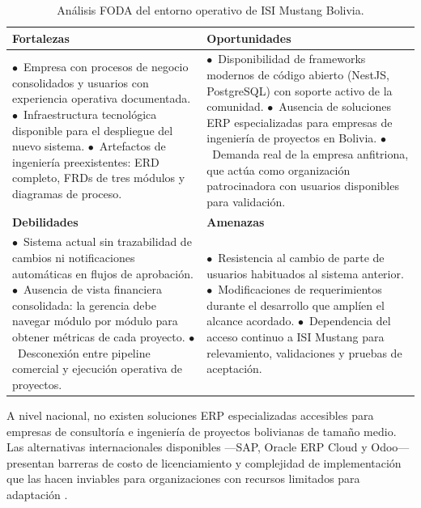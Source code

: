 \documentclass{univalle-perfil}
\begin{document}
\begin{table}[H]
\centering
\caption{Análisis FODA del entorno operativo de ISI Mustang Bolivia.}
{\renewcommand{\arraystretch}{1.5}
\begin{tabular}{|p{}|p{}|}
\hline
\textbf{Fortalezas} & \textbf{Oportunidades} \\
\hline
$\bullet$~Empresa con procesos de negocio consolidados y usuarios con experiencia operativa documentada.\newline
$\bullet$~Infraestructura tecnológica disponible para el despliegue del nuevo sistema.\newline
$\bullet$~Artefactos de ingeniería preexistentes: ERD completo, FRDs de tres módulos y diagramas de proceso.
&
$\bullet$~Disponibilidad de frameworks modernos de código abierto (NestJS, PostgreSQL) con soporte activo de la comunidad.\newline
$\bullet$~Ausencia de soluciones ERP especializadas para empresas de ingeniería de proyectos en Bolivia.\newline
$\bullet$~Demanda real de la empresa anfitriona, que actúa como organización patrocinadora con usuarios disponibles para validación.
\\
\hline
\textbf{Debilidades} & \textbf{Amenazas} \\
\hline
$\bullet$~Sistema actual sin trazabilidad de cambios ni notificaciones automáticas en flujos de aprobación.\newline
$\bullet$~Ausencia de vista financiera consolidada: la gerencia debe navegar módulo por módulo para obtener métricas de cada proyecto.\newline
$\bullet$~Desconexión entre pipeline comercial y ejecución operativa de proyectos.
&
$\bullet$~Resistencia al cambio de parte de usuarios habituados al sistema anterior.\newline
$\bullet$~Modificaciones de requerimientos durante el desarrollo que amplíen el alcance acordado.\newline
$\bullet$~Dependencia del acceso continuo a ISI Mustang para relevamiento, validaciones y pruebas de aceptación.
\\
\hline
\end{tabular}}
\end{table}

A nivel nacional, no existen soluciones ERP especializadas accesibles para empresas de consultoría e ingeniería de proyectos bolivianas de tamaño medio. Las alternativas internacionales disponibles —SAP, Oracle ERP Cloud y Odoo— presentan barreras de costo de licenciamiento y complejidad de implementación que las hacen inviables para organizaciones con recursos limitados para adaptación \parencite{monk2012}.
\end{document}
